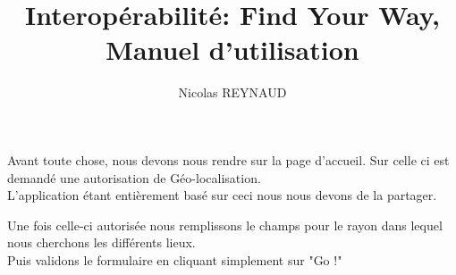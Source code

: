 \documentclass[10pt,a4paper, landscape]{report}
\author{Nicolas REYNAUD}
\title{ Interopérabilité: Find Your Way, Manuel d'utilisation}
\begin{document}
\maketitle
\newpage

\renewcommand{\contentsname}{Sommaire}
\tableofcontents
\newpage

\center
\section{}

Avant toute chose, nous devons nous rendre sur la page d'accueil. Sur celle ci est demandé une autorisation de Géo-localisation.\\
L'application étant entièrement basé sur ceci nous nous devons de la partager.\\
{%
\setlength{\fboxsep}{0pt}%
\setlength{\fboxrule}{2pt}%
%

\newpage
Une fois celle-ci autorisée nous remplissons le champs pour le rayon dans lequel nous cherchons les différents lieux. \\
Puis validons le formulaire en cliquant simplement sur "Go !" \\
{%
\setlength{\fboxsep}{0pt}%
\setlength{\fboxrule}{2pt}%
%

}}
\end{document}
